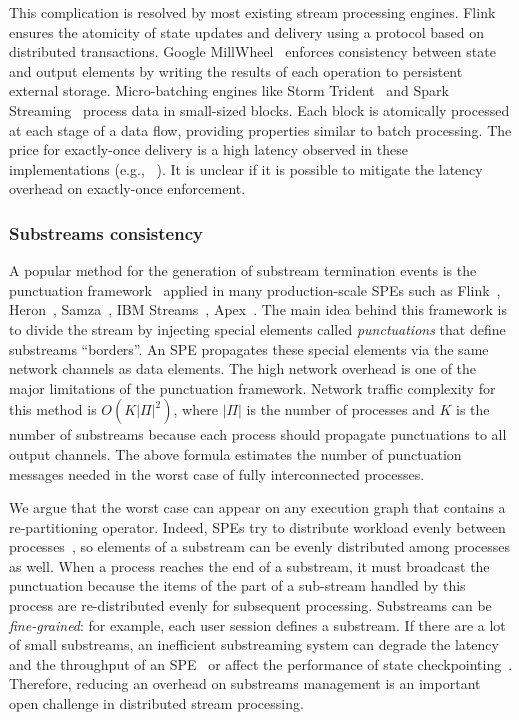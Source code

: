 This complication is resolved by most existing stream processing engines. 
Flink ensures the atomicity of state updates and delivery using a protocol based on distributed transactions. 
Google MillWheel~\cite{Akidau:2013:MFS:2536222.2536229} enforces consistency between state and output elements by writing the results of each operation to persistent external storage. 
Micro-batching engines like Storm Trident~\cite{apache:storm:trident} and Spark Streaming~\cite{Zaharia:2012:DSE:2342763.2342773} process data in small-sized blocks. 
Each block is atomically processed at each stage of a data flow, providing properties similar to batch processing. 
The price for exactly-once delivery is a high latency observed in these implementations (e.g., ~\cite{7530084, 7474816}). It is unclear if it is possible to mitigate the latency overhead on exactly-once enforcement.

\subsubsection{Substreams consistency}

A popular method for the generation of substream termination events is the punctuation framework~\cite{tucker2003exploiting} applied in many production-scale SPEs such as Flink~\cite{carbone2015apache}, Heron~\cite{Kulkarni:2015:THS:2723372.2742788}, Samza~\cite{Noghabi:2017:SSS:3137765.3137770}, IBM Streams~\cite{jacques2016consistent}, Apex~\cite{pathak2016introduction}. The main idea behind this framework is to divide the stream by injecting special elements called {\em punctuations} that define substreams ``borders''. An SPE propagates these special elements via the same network channels as data elements. The high network overhead is one of the major limitations of the punctuation framework. Network traffic complexity for this method is $O(K|\Pi|^2)$, where $|\Pi|$ is the number of processes and $K$ is the number of substreams because each process should propagate punctuations to all output channels. The above formula estimates the number of punctuation messages needed in the worst case of fully interconnected processes. 

We argue that the worst case can appear on any execution graph that contains a re-partitioning operator. Indeed, SPEs try to distribute workload evenly between processes~\cite{carbone2015apache, Kulkarni:2015:THS:2723372.2742788, Akidau:2013:MFS:2536222.2536229}, so elements of a substream can be evenly distributed among processes as well. When a process reaches the end of a substream, it must broadcast the punctuation because the items of the part of a sub-stream handled by this process are re-distributed evenly for subsequent processing. Substreams can be {\em fine-grained}: for example, each user session defines a substream. If there are a lot of small substreams, an inefficient substreaming system can degrade the latency~\cite{DBLP:journals/pvldb/BegoliACHKKMS21} and the throughput of an SPE~\cite{Li:2008:OPN:1453856.1453890} or affect the performance of state checkpointing~\cite{zhang2021research}. Therefore, reducing an overhead on substreams management is an important open challenge in distributed stream processing.


